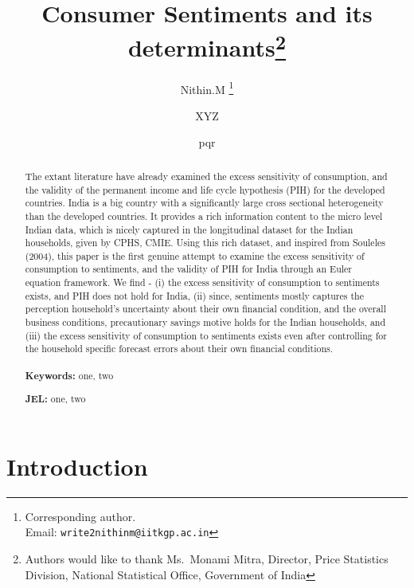 \documentclass[
  12pt,
  a4paper,
  abstract]{scrartcl}
\title{Consumer Sentiments and its determinants\thanks{Authors would
like to thank Ms.~Monami Mitra, Director, Price Statistics Division,
National Statistical Office, Government of India}}
\author[1]{Nithin.M%
\thanks{Corresponding author.\\ Email: \texttt{write2nithinm@iitkgp.ac.in}}%
   }
\author[2]{XYZ%
   }
\author[1, 2]{pqr%
   }
\affil[1]{
      Department of Humanities and Social Sciences, IIT Kharagpur
  }
\affil[2]{
      University of Hyderabad
  }
\date{} %
\begin{document}
\maketitle

\begin{abstract}
The extant literature have already examined the excess sensitivity of
consumption, and the validity of the permanent income and life cycle
hypothesis (PIH) for the developed countries. India is a big country
with a significantly large cross sectional heterogeneity than the
developed countries. It provides a rich information content to the micro
level Indian data, which is nicely captured in the longitudinal dataset
for the Indian households, given by CPHS, CMIE. Using this rich dataset,
and inspired from Souleles (2004), this paper is the first genuine
attempt to examine the excess sensitivity of consumption to sentiments,
and the validity of PIH for India through an Euler equation framework.
We find - (i) the excess sensitivity of consumption to sentiments
exists, and PIH does not hold for India, (ii) since, sentiments mostly
captures the perception household's uncertainty about their own
financial condition, and the overall business conditions, precautionary
savings motive holds for the Indian households, and (iii) the excess
sensitivity of consumption to sentiments exists even after controlling
for the household specific forecast errors about their own financial
conditions. %
\\
\\
\noindent%
\textbf{Keywords:} one, two %
 
\noindent%
\textbf{JEL:} one, two
\end{abstract}


\newpage

\section{Introduction}\label{sec-1}
\end{document}
